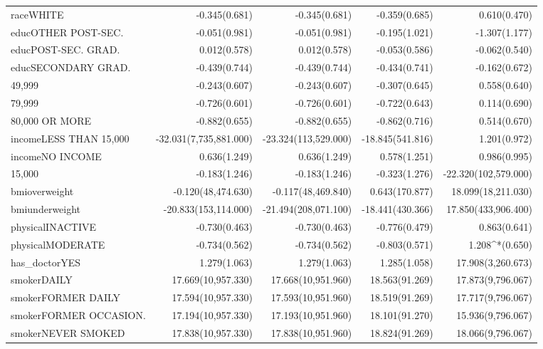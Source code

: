\documentclass{article}\usepackage[]{graphicx}\usepackage[]{color}
\begin{document}
\begin{longtable}{@{\extracolsep{-15pt}}lD{.}{.}{-3} D{.}{.}{-3} D{.}{.}{-3} D{.}{.}{-3} }
  raceWHITE & -0.345$ $(0.681) & -0.345$ $(0.681) & -0.359$ $(0.685) & 0.610$ $(0.470) \\ 
  educOTHER POST-SEC. & -0.051$ $(0.981) & -0.051$ $(0.981) & -0.195$ $(1.021) & -1.307$ $(1.177) \\ 
  educPOST-SEC. GRAD. & 0.012$ $(0.578) & 0.012$ $(0.578) & -0.053$ $(0.586) & -0.062$ $(0.540) \\ 
  educSECONDARY GRAD. & -0.439$ $(0.744) & -0.439$ $(0.744) & -0.434$ $(0.741) & -0.162$ $(0.672) \\ 
  49,999 & -0.243$ $(0.607) & -0.243$ $(0.607) & -0.307$ $(0.645) & 0.558$ $(0.640) \\ 
  79,999 & -0.726$ $(0.601) & -0.726$ $(0.601) & -0.722$ $(0.643) & 0.114$ $(0.690) \\ 
  80,000 OR MORE & -0.882$ $(0.655) & -0.882$ $(0.655) & -0.862$ $(0.716) & 0.514$ $(0.670) \\ 
  incomeLESS THAN 15,000 & -32.031$ $(7,735,881.000) & -23.324$ $(113,529.000) & -18.845$ $(541.816) & 1.201$ $(0.972) \\ 
  incomeNO INCOME & 0.636$ $(1.249) & 0.636$ $(1.249) & 0.578$ $(1.251) & 0.986$ $(0.995) \\ 
  15,000 & -0.183$ $(1.246) & -0.183$ $(1.246) & -0.323$ $(1.276) & -22.320$ $(102,579.000) \\ 
  bmioverweight & -0.120$ $(48,474.630) & -0.117$ $(48,469.840) & 0.643$ $(170.877) & 18.099$ $(18,211.030) \\ 
  bmiunderweight & -20.833$ $(153,114.000) & -21.494$ $(208,071.100) & -18.441$ $(430.366) & 17.850$ $(433,906.400) \\ 
  physicalINACTIVE & -0.730$ $(0.463) & -0.730$ $(0.463) & -0.776$ $(0.479) & 0.863$ $(0.641) \\ 
  physicalMODERATE & -0.734$ $(0.562) & -0.734$ $(0.562) & -0.803$ $(0.571) & 1.208^{*}$ $(0.650) \\ 
  has\_doctorYES & 1.279$ $(1.063) & 1.279$ $(1.063) & 1.285$ $(1.058) & 17.908$ $(3,260.673) \\ 
  smokerDAILY & 17.669$ $(10,957.330) & 17.668$ $(10,951.960) & 18.563$ $(91.269) & 17.873$ $(9,796.067) \\ 
  smokerFORMER DAILY & 17.594$ $(10,957.330) & 17.593$ $(10,951.960) & 18.519$ $(91.269) & 17.717$ $(9,796.067) \\ 
  smokerFORMER OCCASION. & 17.194$ $(10,957.330) & 17.193$ $(10,951.960) & 18.101$ $(91.270) & 15.936$ $(9,796.067) \\ 
  smokerNEVER SMOKED & 17.838$ $(10,957.330) & 17.838$ $(10,951.960) & 18.824$ $(91.269) & 18.066$ $(9,796.067) \\ 

\end{longtable}
\end{document}
